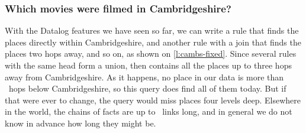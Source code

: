 \begin{frame}
    \label{s:cambs-dag}
    \frametitle{Which movies were filmed in Cambridgeshire?}
    \begin{center}
    \end{center}
\end{frame}
\label{l:cambs-dag}

With the Datalog features we have seen so far, we can write a rule that finds the places directly within Cambridgeshire, and another rule with a join that finds the places two hops away, and so on, as shown on \autoref{l:cambs-fixed}.
Since several rules with the same head form a union,  then contains all the places up to three hops away from Cambridgeshire.
As it happens, no place in our data is more than \reccambsdepth\ hops below Cambridgeshire, so this query does find all of them today.
But if that were ever to change, the query would miss places four levels deep.
Elsewhere in the world, the chains of  facts are up to \recmaxlinks\ links long, and in general we do not know in advance how long they might be.

